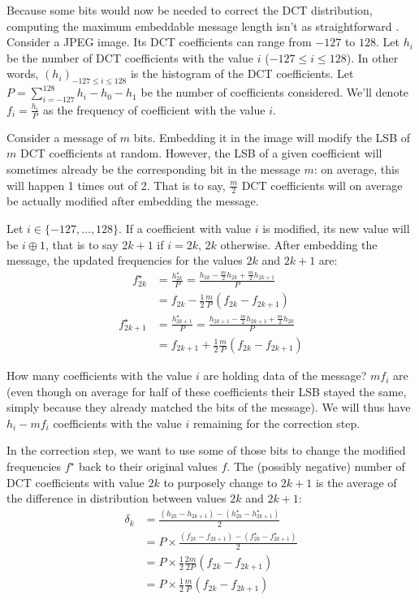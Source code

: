 \documentclass{article}
\begin{document}
Because some bits would now be needed to correct the DCT distribution, computing the maximum embeddable message length isn't as straightforward \cite{def01}\cite{att02}. Consider a JPEG image. Its DCT coefficients can range from $-127$ to $128$. Let $h_i$ be the number of DCT coefficients with the value $i$ ($-127 \le i \le 128$). In other words, $(h_i)_{-127 \le i \le 128}$ is the histogram of the DCT coefficients. Let $P = \sum_{i = -127}^{128} h_i - h_0 - h_1$ be the number of coefficients considered. We'll denote $f_i = \frac {h_i} P$ as the frequency of coefficient with the value $i$.

Consider a message of $m$ bits. Embedding it in the image will modify the LSB of $m$ DCT coefficients at random. However, the LSB of a given coefficient will sometimes already be the corresponding bit in the message $m$: on average, this will happen 1 times out of 2. That is to say, $\frac m 2$ DCT coefficients will on average be actually modified after embedding the message.

Let $i \in \{-127, \ldots, 128\}$. If a coefficient with value $i$ is modified, its new value will be $i \oplus 1$, that is to say $2k + 1$ if $i = 2k$, $2k$ otherwise. After embedding the message, the updated frequencies for the values $2k$ and $2k + 1$ are: \[
	\begin{aligned}
		f_{2k}^\star &= \frac {h_{2k}^\star} P = \frac {h_{2k} - \frac m 2 h_{2k} + \frac m 2 h_{2k + 1}} P \\
		&= f_{2k} - \frac 1 2 \frac m P \left( f_{2k} - f_{2k + 1} \right)		
	\end{aligned}
\]\[
	\begin{aligned}
		f_{2k + 1}^\star &= \frac {h_{2k + 1}^\star} P = \frac {h_{2k + 1} - \frac m 2 h_{2k + 1} + \frac m 2 h_{2k}} P \\
		&= f_{2k + 1} + \frac 1 2 \frac m P \left( f_{2k} - f_{2k + 1} \right)
	\end{aligned}
\]

How many coefficients with the value $i$ are holding data of the message? $m f_i$ are (even though on average for half of these coefficients their LSB stayed the same, simply because they already matched the bits of the message). We will thus have $h_i - m f_i$ coefficients with the value $i$ remaining for the correction step.

In the correction step, we want to use some of those bits to change the modified frequencies $f^\star$ back to their original values $f$. The (possibly negative) number of DCT coefficients with value $2k$ to purposely change to $2k + 1$ is the average of the difference in distribution between values $2k$ and $2k + 1$: \[
	\begin{aligned}
		\delta_k &= \frac {(h_{2k} - h_{2k+1}) - (h^\star_{2k} - h^\star_{2k + 1})} 2	\\
			&= P \times \frac {(f_{2k} - f_{2k+1}) - (f^\star_{2k} - f^\star_{2k + 1})} 2	\\
			&= P \times \frac 1 2 \frac {2m} {2P} \left(f_{2k} - f_{2k + 1}\right) \\
			&= P \times \frac 1 2 \frac m P \left(f_{2k} - f_{2k + 1}\right)
	\end{aligned}
\]
\end{document}
